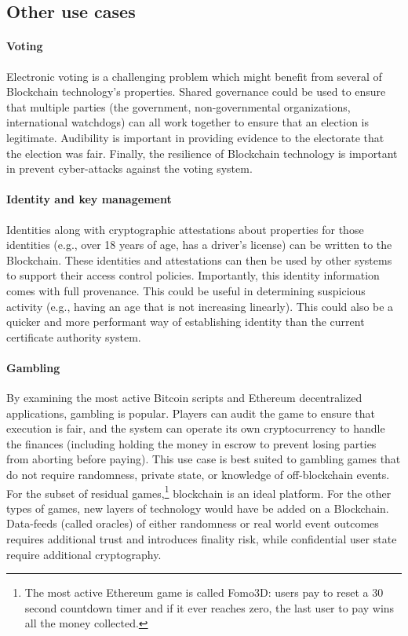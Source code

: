 \subsection{Other use cases}

\paragraph{Voting}
Electronic voting is a challenging problem which might benefit from several of Blockchain technology's properties.
Shared governance could be used to ensure that multiple parties (the government, non-governmental organizations, international watchdogs) can all work together to ensure that an election is legitimate.
Audibility is important in providing evidence to the electorate that the election was fair.
Finally, the resilience of Blockchain technology is important in prevent cyber-attacks against the voting system.

\paragraph{Identity and key management}
Identities along with cryptographic attestations about properties for those identities (e.g., over 18 years of age, has a driver's license) can be written to the Blockchain.
These identities and attestations can then be used by other systems to support their access control policies.
Importantly, this identity information comes with full provenance. This could be useful in determining suspicious activity (e.g., having an age that is not increasing linearly).
This could also be a quicker and more performant way of establishing identity than the current certificate authority system.

\paragraph{Gambling}
By examining the most active Bitcoin scripts and Ethereum decentralized applications, gambling is popular. Players can audit the game to ensure that execution is fair, and the system can operate its own cryptocurrency to handle the finances (including holding the money in escrow to prevent losing parties from aborting before paying). This use case is best suited to gambling games that do not require randomness, private state, or knowledge of off-blockchain events. For the subset of residual games,\footnote{The most active Ethereum game is called Fomo3D: users pay to reset a 30 second countdown timer and if it ever reaches zero, the last user to pay wins all the money collected.} blockchain is an ideal platform. For the other types of games, new layers of technology would have be added on a Blockchain. Data-feeds (called oracles) of either randomness or real world event outcomes requires additional trust and introduces finality risk, while confidential user state require additional cryptography.  

